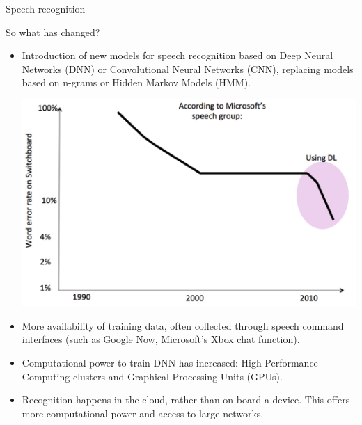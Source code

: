 \documentclass[compress]{beamer}
\begin{document}
\begin{frame}{Speech recognition}

So what has changed?

\begin{itemize}

\item Introduction of new models for speech recognition based on Deep Neural
  Networks (DNN) or Convolutional Neural Networks (CNN), replacing
  models based on n-grams or Hidden Markov Models (HMM).

        \begin{center}
            \includegraphics[width=0.8\linewidth]{asr-evolution}
        \end{center}
\item More availability of training data, often collected through speech
  command interfaces (such as Google Now, Microsoft's Xbox chat
  function).
\item Computational power to train DNN has increased: High Performance
  Computing clusters and Graphical Processing Units (GPUs).
\item Recognition happens in the cloud, rather than on-board a device. This
  offers more computational power and access to large networks.
\end{itemize}

\end{frame}

\end{document}
